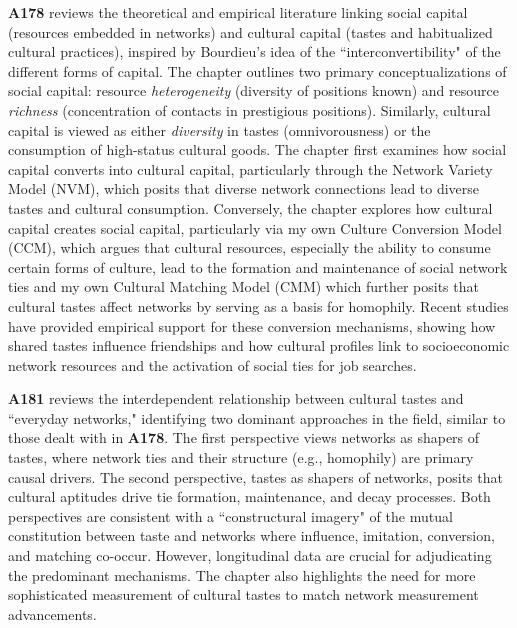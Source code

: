 \documentclass[a4paper,11pt]{extarticle}
\begin{document}
\textbf{A178} reviews the theoretical and empirical literature linking social capital (resources embedded in networks) and cultural capital (tastes and habitualized cultural practices), inspired by Bourdieu's idea of the ``interconvertibility" of the different forms of capital. The chapter outlines two primary conceptualizations of social capital: resource \textit{heterogeneity} (diversity of positions known) and resource \textit{richness} (concentration of contacts in prestigious positions). Similarly, cultural capital is viewed as either \textit{diversity} in tastes (omnivorousness) or the consumption of high-status cultural goods. The chapter first examines how social capital converts into cultural capital, particularly through the Network Variety Model (NVM), which posits that diverse network connections lead to diverse tastes and cultural consumption. Conversely, the chapter explores how cultural capital creates social capital, particularly via my own Culture Conversion Model (CCM), which argues that cultural resources, especially the ability to consume certain forms of culture, lead to the formation and maintenance of social network ties and my own Cultural Matching Model (CMM) which further posits that cultural tastes affect networks by serving as a basis for homophily. Recent studies have provided empirical support for these conversion mechanisms, showing how shared tastes influence friendships and how cultural profiles link to socioeconomic network resources and the activation of social ties for job searches.

\textbf{A181} reviews the interdependent relationship between cultural tastes and ``everyday networks," identifying two dominant approaches in the field, similar to those dealt with in \textbf{A178}. The first perspective views networks as shapers of tastes, where network ties and their structure (e.g., homophily) are primary causal drivers.  The second perspective, tastes as shapers of networks, posits that cultural aptitudes drive tie formation, maintenance, and decay processes. Both perspectives are consistent with a ``constructural imagery" of the mutual constitution between taste and networks where influence, imitation, conversion, and matching co-occur. However, longitudinal data are crucial for adjudicating the predominant mechanisms. The chapter also highlights the need for more sophisticated measurement of cultural tastes to match network measurement advancements.
\end{document}
